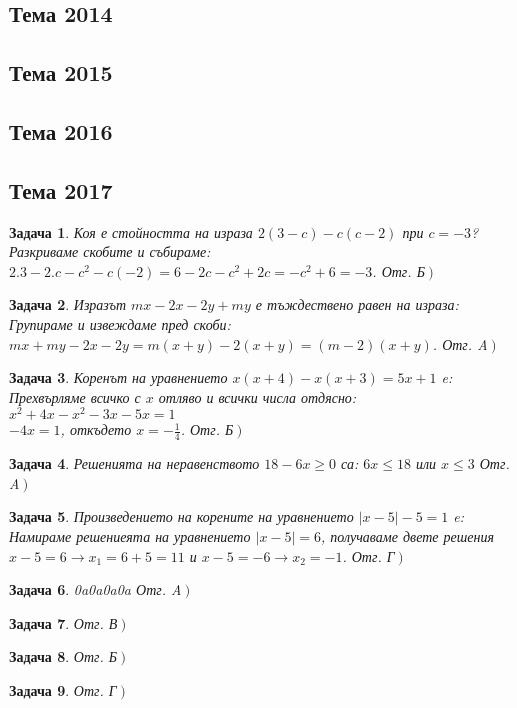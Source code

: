 \documentclass{article}
\theoremstyle{plain}
\newtheorem*{problem*}{Задача}
\begin{document}
\subsection{Тема 2014}
\subsection{Тема 2015}
\subsection{Тема 2016}
\subsection{Тема 2017}
\begin{problem*}
	Коя е стойността на израза $2(3-c)-c(c-2) $ при $c=-3$?\\
	Разкриваме скобите и събираме: $2.3 -2.c -c^2 -c(-2) = 6-2c - c^2 + 2c = -c^2 + 6 = -3$. Отг. Б$\left. \right)$
\end{problem*}
	\begin{problem*}
	Изразът $mx-2x -2y + my$ е тъждествено равен на израза:\\
	Групираме и извеждаме пред скоби: $mx+my -2x -2y = m(x+y)-2(x+y) = (m-2)(x+y) $. Отг. A$\left. \right)$ 
\end{problem*}
\begin{problem*}
	Коренът на уравнението $x(x+4)-x(x+3) = 5x + 1$ e:\\
	Прехвърляме всичко с $x$ отляво и всички числа отдясно:\\
	$x^2 +4x - x^2 -3x -5x = 1 $\\
	$-4x = 1 $, откъдето $x = -\frac{1}{4} $. Отг. Б$\left. \right)$ 
\end{problem*}
\begin{problem*}
	Решенията на неравенството $18 -6x \geq 0$ са: 
	$6x \leq 18 $ или $ x \leq 3 $
	Отг. A$\left. \right)$ 
\end{problem*}

\begin{problem*} Произведението на корените на уравнението $\left|x-5 \right| -5 = 1 $ e: \\
	Намираме решениеята на уравнението $\left|x-5 \right| = 6 $, получаваме двете решения $x-5 = 6 \to x_1 = 6+5=11 $ и $x-5=-6 \to x_2 = -1 $.
	Отг. Г$\left. \right)$ 
\end{problem*}
\begin{problem*}0a0a0a0a
	Отг. A$\left. \right)$ 
\end{problem*}
\begin{problem*}
	Отг. В$\left. \right)$ 
\end{problem*}
\begin{problem*}
	Отг. Б$\left. \right)$ 
\end{problem*}
\begin{problem*}
	Отг. Г$\left. \right)$ 
\end{problem*}
\end{document}
